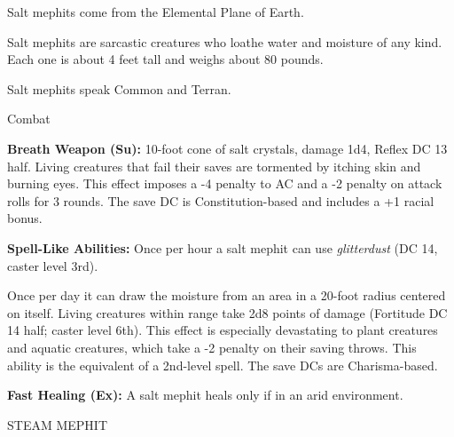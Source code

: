\documentclass{article}
\begin{document}
Salt mephits come from the Elemental Plane of Earth.

Salt mephits are sarcastic creatures who loathe water and moisture of any kind. 
Each one is about 4 feet tall and weighs about 80 pounds.

Salt mephits speak Common and Terran.

Combat

\textbf{Breath Weapon (Su): }10-foot cone of salt crystals, damage 1d4, Reflex 
DC 13 half. Living creatures that fail their saves are tormented by itching skin 
and burning eyes. This effect imposes a -4 penalty to AC and a -2 penalty on attack 
rolls for 3 rounds. The save DC is Constitution-based and includes a +1 racial 
bonus.

\textbf{Spell-Like Abilities: }Once per hour a salt mephit can use \textit{glitterdust 
}(DC 14, caster level 3rd).

Once per day it can draw the moisture from an area in a 20-foot radius centered 
on itself. Living creatures within range take 2d8 points of damage (Fortitude DC 
14 half; caster level 6th). This effect is especially devastating to plant creatures 
and aquatic creatures, which take a -2 penalty on their saving throws. This ability 
is the equivalent of a 2nd-level spell. The save DCs are Charisma-based.

\textbf{Fast Healing (Ex): }A salt mephit heals only if in an arid environment.

\vspace{12pt}
STEAM MEPHIT
\end{document}
